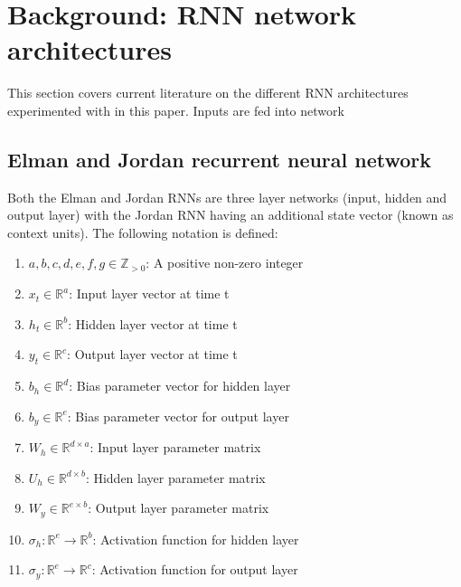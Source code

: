 \documentclass[conference]{IEEEtran}
\begin{document}
\section{Background: RNN network architectures}

This section covers current literature on the different RNN architectures experimented with in this paper. Inputs are fed into network 

\subsection{Elman and Jordan recurrent neural network}

Both the Elman and Jordan RNNs are three layer networks (input, hidden and output layer) with the Jordan RNN having an additional state vector (known as context units). The following notation is defined:

\begin{enumerate}
	\item $a,b,c,d,e,f,g \in \mathbb{Z}_{>0}$: A positive non-zero integer
	
	\item $x_t \in \mathbb{R}^a$: Input layer vector at time t
	\item $h_t \in \mathbb{R}^b$: Hidden layer vector at time t
	\item $y_t \in \mathbb{R}^c$: Output layer vector at time t
	
	\item $b_h \in \mathbb{R}^{d}$: Bias parameter vector for hidden layer
	\item $b_y \in \mathbb{R}^{e}$: Bias parameter vector for output layer
	
	\item $W_h \in \mathbb{R}^{d \times a}$: Input layer parameter matrix
	\item $U_h \in \mathbb{R}^{d \times b}$: Hidden layer parameter matrix
	
	\item $W_y \in \mathbb{R}^{e \times b}$: Output layer parameter matrix
	
	
	\item $\sigma_h: \mathbb{R}^e \to \mathbb{R}^b $: Activation function for hidden layer
	\item $\sigma_y: \mathbb{R}^e \to \mathbb{R}^c $: Activation function for output layer
\end{enumerate}

\end{document}
